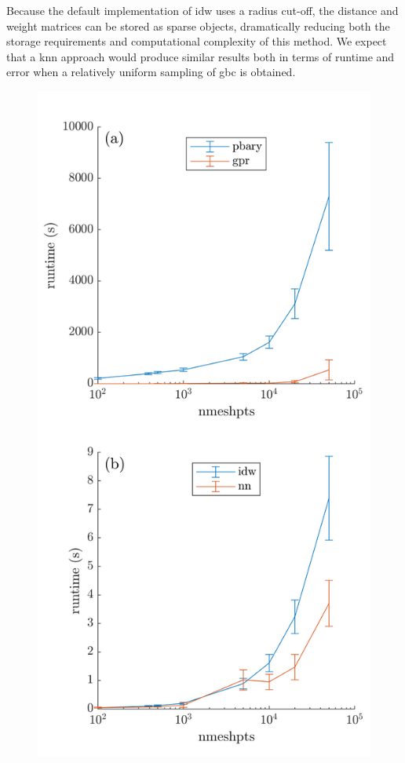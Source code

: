 \documentclass[preprint,12pt]{elsarticle}
\begin{document}
Because the default implementation of \gls{idw} uses a radius cut-off, the distance and weight matrices can be stored as sparse objects, dramatically reducing both the storage requirements and computational complexity of this method. We expect that a \gls{knn} approach would produce similar results both in terms of runtime and error when a relatively uniform sampling of \gls{gbc} is obtained.

\begin{figure}
    \centering
    \includegraphics[scale=1]{runtime.png}

\end{figure}
\end{document}
